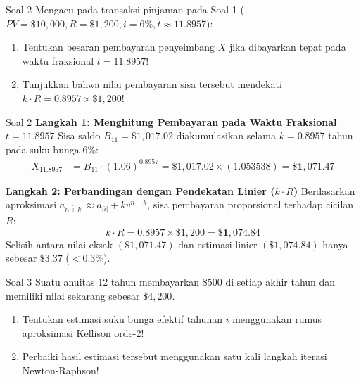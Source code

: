 \documentclass[11pt,a4paper]{article}
\begin{document}
\vspace{1.5em}

\begin{problembox}[Bobot: Standar SOA FM / Pembayaran Fraksional $t = n+k$]{Soal 2}
Mengacu pada transaksi pinjaman pada Soal 1 ($PV = \$10{,}000, R = \$1{,}200, i = 6\%, t \approx 11.8957$):
\begin{enumerate}[label=(\alph*)]
    \item Tentukan besaran pembayaran penyeimbang $X$ jika dibayarkan tepat pada waktu fraksional $t = 11.8957$!
    \item Tunjukkan bahwa nilai pembayaran sisa tersebut mendekati $k \cdot R = 0.8957 \times \$1{,}200$!
\end{enumerate}
\end{problembox}

\begin{solutionbox}{Soal 2}
\textbf{Langkah 1: Menghitung Pembayaran pada Waktu Fraksional $t = 11.8957$}
Sisa saldo $B_{11} = \$1{,}017.02$ diakumulasikan selama $k = 0.8957$ tahun pada suku bunga $6\%$:
\begin{align*}
    X_{11.8957} &= B_{11} \cdot (1.06)^{0.8957} = \$1{,}017.02 \times (1.053538) = \mathbf{\$1{,}071.47}
\end{align*}

\textbf{Langkah 2: Perbandingan dengan Pendekatan Linier ($k \cdot R$)}
Berdasarkan aproksimasi $a_{\overline{n+k}|} \approx a_{\overline{n}|} + k v^{n+k}$, sisa pembayaran proporsional terhadap cicilan $R$:
\begin{equation*}
    k \cdot R = 0.8957 \times \$1{,}200 = \mathbf{\$1{,}074.84}
\end{equation*}
Selisih antara nilai eksak $(\$1{,}071.47)$ dan estimasi linier $(\$1{,}074.84)$ hanya sebesar $\$3.37$ ($< 0.3\%$).
\end{solutionbox}

\vspace{1.5em}

\begin{problembox}{Soal 3}
Suatu anuitas 12 tahun membayarkan $\$500$ di setiap akhir tahun dan memiliki nilai sekarang sebesar $\$4{,}200$.
\begin{enumerate}[label=(\alph*)]
    \item Tentukan estimasi suku bunga efektif tahunan $i$ menggunakan rumus aproksimasi Kellison orde-2!
    \item Perbaiki hasil estimasi tersebut menggunakan satu kali langkah iterasi Newton-Raphson!
\end{enumerate}
\end{problembox}
\end{document}

